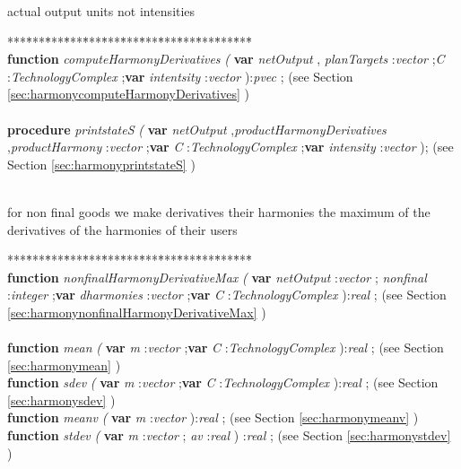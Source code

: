 actual output units not intensities
\begin{tabbing}
***\=***\=***\=***\=***\=***\=***\=***\=***\=***\=***\=***\=***\=\kill
\+ \+ \\
\<\textsf{\textbf{function}  \textit{computeHarmonyDerivatives} \textit{(} \textbf{var}  \textit{netOutput} , \textit{planTargets} :\textit{vector} ;\textit{C} :\textit{TechnologyComplex} ;\textbf{var}  \textit{intentsity} :\textit{vector} ):\textit{pvec}  ;} (see Section \ref{sec:harmonycomputeHarmonyDerivatives} )\\
\\
\<\textsf{\textbf{procedure}  \textit{printstateS} \textit{(} \textbf{var}  \textit{netOutput} ,\textit{productHarmonyDerivatives} ,\textit{productHarmony} :\textit{vector} ;\textbf{var}  \textit{C} :\textit{TechnologyComplex}  ;\textbf{var}  \textit{intensity} :\textit{vector} );} (see Section \ref{sec:harmonyprintstateS} )\\
\\
\end{tabbing}
for non final goods we make derivatives their harmonies the maximum of the derivatives of the harmonies of their users
\begin{tabbing}
***\=***\=***\=***\=***\=***\=***\=***\=***\=***\=***\=***\=***\=\kill
\+ \+ \\
\<\textsf{\textbf{function}  \textit{nonfinalHarmonyDerivativeMax} \textit{(} \textbf{var}  \textit{netOutput} :\textit{vector} ;  \textit{nonfinal} :\textit{integer} ;\textbf{var}  \textit{dharmonies} :\textit{vector} ;\textbf{var}  \textit{C} :\textit{TechnologyComplex}   ):\textit{real} ;} (see Section \ref{sec:harmonynonfinalHarmonyDerivativeMax} )\\
\\
\<\textsf{\textbf{function}  \textit{mean} \textit{(} \textbf{var}   \textit{m} :\textit{vector} ;\textbf{var}  \textit{C} :\textit{TechnologyComplex}   ):\textit{real} ;} (see Section \ref{sec:harmonymean} )\\
\<\textsf{\textbf{function}  \textit{sdev} \textit{(} \textbf{var}   \textit{m} :\textit{vector} ;\textbf{var}  \textit{C} :\textit{TechnologyComplex}   ):\textit{real} ;} (see Section \ref{sec:harmonysdev} )\\
\<\textsf{\textbf{function}  \textit{meanv} \textit{(} \textbf{var}  \textit{m} :\textit{vector}   ):\textit{real} ;} (see Section \ref{sec:harmonymeanv} )\\
\<\textsf{\textbf{function}   \textit{stdev} \textit{(} \textbf{var}  \textit{m} :\textit{vector} ;  \textit{av} :\textit{real} ) :\textit{real} ;} (see Section \ref{sec:harmonystdev} )\\
\\
\end{tabbing}
